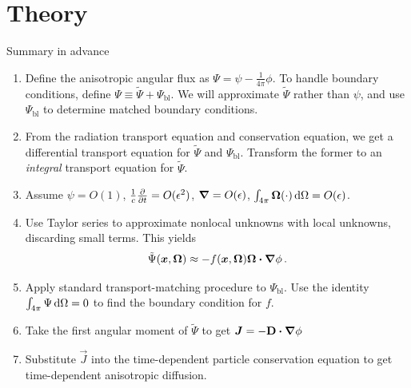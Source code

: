 \documentclass{beamer}
\begin{document}
\section{Theory}
\begin{frame}{Summary in advance}
\begin{enumerate}
  \item Define the anisotropic angular flux as $\Psi = \psi -
    \frac{1}{4\pi}\phi$. To handle boundary conditions, define $\Psi
    \equiv \tilde \Psi + \Psi_\mathrm{bl}$. We will approximate $\tilde \Psi$
    rather than $\psi$, and use $\Psi_\mathrm{bl}$ to determine matched boundary
    conditions.
  \item From the radiation transport equation and conservation equation, we get
    a differential transport equation for $\tilde \Psi$ and $\Psi_\mathrm{bl}$.
    Transform the former to an \emph{integral} transport equation for $\tilde
    \Psi$.
  \item Assume $\psi=O(1)$, $\frac1c\frac{\partial }{\partial t}=O(\epsilon^2)$, $\bm{\nabla} =
    O(\epsilon)$, $\int_{4\pi} \bm{\Omega} (\cdot) \mathop{}\!\mathrm{d}\Omega = O(\epsilon)$.
  \item Use Taylor series to approximate nonlocal unknowns with local
    unknowns, discarding small terms. This yields
    \begin{equation*}
      \tilde \Psi(\bm{x}, \bm{\Omega})
      \approx - f(\bm{x}, \bm{\Omega})  \bm{\Omega} \bm{\cdot} \bm{\nabla} \phi\,.
    \end{equation*}
  \item Apply standard transport-matching procedure to $\Psi_\mathrm{bl}$. Use
    the identity $\int_{4\pi} \Psi \mathop{}\!\mathrm{d}\Omega=0$ to find the boundary condition
    for $f$.
  \item Take the first angular moment of $\tilde \Psi$ to get
    $\bm{J}=-\mathbf{D} \bm{\cdot} \bm{\nabla} \phi$
  \item Substitute $\vec{J}$ into the time-dependent particle
    conservation equation to get time-dependent anisotropic diffusion.
\end{enumerate}
\end{frame}
\end{document}
